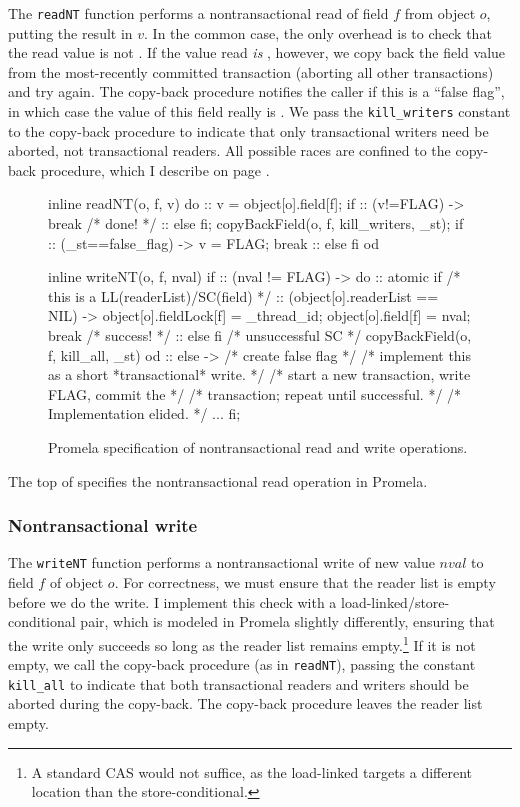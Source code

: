 The {\tt readNT} function performs a nontransactional read of field $f$ from
object $o$, putting the result in $v$.  
In the common case, the only overhead is to check that
the read value is not \FLAG.  If the value read \emph{is}
\FLAG, however, we copy back the field value 
from the most-recently committed transaction (aborting all other
transactions) and try again.  The copy-back procedure notifies
the caller if this is a ``false flag'', in which case the value of this
field really is \FLAG.  We pass the {\tt kill\_writers} constant
to the copy-back procedure to
indicate that only transactional writers need be aborted, not
transactional readers.
All possible races are confined to the copy-back procedure, which I
describe on page \pageref{sec:copyback}.

\begin{figure}
\begin{inlinecode}
inline readNT(o, f, v) {
  do
  :: v = object[o].field[f];
     if
     :: (v!=FLAG) -> break /* done! */
     :: else
     fi;
     copyBackField(o, f, kill_writers, _st);
     if
     :: (_st==false_flag) ->
        v = FLAG;
        break
     :: else
     fi
  od
}

inline writeNT(o, f, nval) {
  if
  :: (nval != FLAG) ->
     do
     :: atomic {
          if /* this is a LL(readerList)/SC(field) */
          :: (object[o].readerList == NIL) ->
             object[o].fieldLock[f] = _thread_id;
             object[o].field[f] = nval;
             break /* success! */
          :: else
          fi
        }
        /* unsuccessful SC */
        copyBackField(o, f, kill_all, _st)
     od
  :: else -> /* create false flag */
     /* implement this as a short *transactional* write. */
     /* start a new transaction, write FLAG, commit the */
     /* transaction; repeat until successful. */
     /* Implementation elided. */
     ...
  fi;
}
\end{inlinecode}
\caption{Promela specification of nontransactional read and write operations.}
\label{fig:promrwnt}
\end{figure}
The top of  specifies the nontransactional read operation in
Promela.

\subsubsection{Nontransactional write}
The {\tt writeNT} function performs a nontransactional write of new value $nval$
to field $f$ of object $o$.  For correctness, we must ensure that
the reader list is empty before we do the write.  I implement this check
with a load-linked/store-conditional pair, which is modeled in
Promela slightly differently, ensuring that the write only succeeds
so long as the reader list remains empty.\footnote{A
  standard CAS would not suffice, as the load-linked targets a
  different location than the store-conditional.}
If it is not empty, we
call the copy-back procedure (as in {\tt readNT}), passing the
constant {\tt kill\_all} to indicate that both transactional readers
and writers should be aborted during the copy-back.  The copy-back
procedure leaves the reader list empty.

